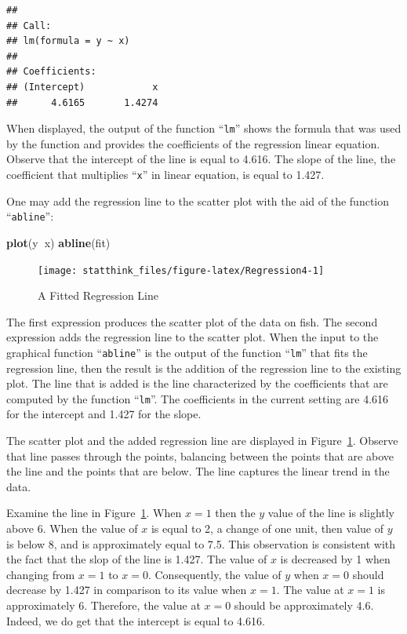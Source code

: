 \documentclass[]{krantz}
\makeatletter
\newenvironment{Shaded}{\begin{snugshade}}{\end{snugshade}}
\newcommand{\KeywordTok}[1]{\textcolor[rgb]{0.13,0.29,0.53}{\textbf{#1}}}
\newcommand{\NormalTok}[1]{#1}
\newcommand{\OperatorTok}[1]{\textcolor[rgb]{0.81,0.36,0.00}{\textbf{#1}}}
\newenvironment{kframe}{%
\medskip{}
\setlength{\fboxsep}{.8em}
 \def\at@end@of@kframe{}%
 \ifinner\ifhmode%
  \def\at@end@of@kframe{\end{minipage}}%
  \begin{minipage}{\columnwidth}%
 \fi\fi%
 \def\FrameCommand##1{\hskip\@totalleftmargin \hskip-\fboxsep
 \colorbox{shadecolor}{##1}\hskip-\fboxsep
     \hskip-\linewidth \hskip-\@totalleftmargin \hskip\columnwidth}%
 \MakeFramed {\advance\hsize-\width
   \@totalleftmargin\z@ \linewidth\hsize
   \@setminipage}}%
 {\par\unskip\endMakeFramed%
 \at@end@of@kframe}
\renewenvironment{Shaded}{\begin{kframe}}{\end{kframe}}
\theoremstyle{definition}
\theoremstyle{definition}
\theoremstyle{definition}
\theoremstyle{remark}
\makeatother
\begin{document}
\begin{verbatim}
## 
## Call:
## lm(formula = y ~ x)
## 
## Coefficients:
## (Intercept)            x  
##      4.6165       1.4274
\end{verbatim}

When displayed, the output of the function ``\texttt{lm}'' shows the formula that
was used by the function and provides the coefficients of the regression
linear equation. Observe that the intercept of the line is equal to
4.616. The slope of the line, the coefficient that multiplies ``\texttt{x}'' in
linear equation, is equal to 1.427.

One may add the regression line to the scatter plot with the aid of the
function ``\texttt{abline}'':

\begin{Shaded}
\begin{Highlighting}[]
\KeywordTok{plot}\NormalTok{(y}\OperatorTok{~}\NormalTok{x)}
\KeywordTok{abline}\NormalTok{(fit)}
\end{Highlighting}
\end{Shaded}

\begin{figure}

{\centering \texttt{[image: statthink\_files/figure-latex/Regression4-1]} 

}

\caption{A Fitted Regression Line}\label{fig:Regression4}
\end{figure}

The first expression produces the scatter plot of the data on fish. The
second expression adds the regression line to the scatter plot. When the
input to the graphical function ``\texttt{abline}'' is the output of the function
``\texttt{lm}'' that fits the regression line, then the result is the addition of
the regression line to the existing plot. The line that is added is the
line characterized by the coefficients that are computed by the function
``\texttt{lm}''. The coefficients in the current setting are 4.616 for the
intercept and 1.427 for the slope.

The scatter plot and the added regression line are displayed in
Figure~\ref{fig:Regression4}. Observe that line passes through the
points, balancing between the points that are above the line and the
points that are below. The line captures the linear trend in the data.

Examine the line in Figure~\ref{fig:Regression4}. When \(x=1\) then the
\(y\) value of the line is slightly above 6. When the value of \(x\) is
equal to 2, a change of one unit, then value of \(y\) is below 8, and is
approximately equal to 7.5. This observation is consistent with the fact
that the slop of the line is 1.427. The value of \(x\) is decreased by 1
when changing from \(x=1\) to \(x=0\). Consequently, the value of \(y\) when
\(x=0\) should decrease by 1.427 in comparison to its value when \(x=1\).
The value at \(x=1\) is approximately 6. Therefore, the value at \(x=0\)
should be approximately 4.6. Indeed, we do get that the intercept is
equal to 4.616.
\end{document}
